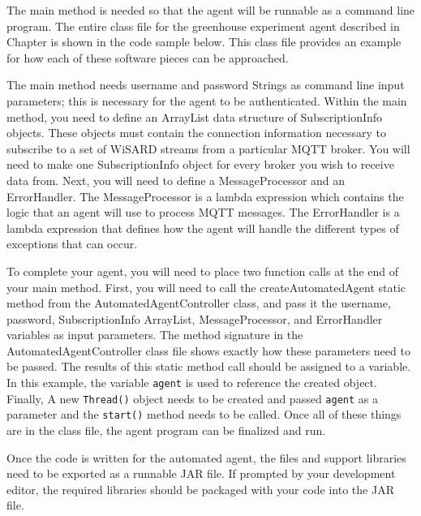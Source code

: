 The main method is needed so that the agent will be runnable as a command line program. The entire class file for the greenhouse experiment agent described in Chapter is shown in the code sample below. This class file provides an example for how each of these software pieces can be approached.



The main method needs username and password Strings as command line input parameters; this is necessary for the agent to be authenticated. Within the main method, you need to define an ArrayList data structure of SubscriptionInfo objects. These objects must contain the connection information necessary to subscribe to a set of WiSARD streams from a particular MQTT broker. You will need to make one SubscriptionInfo object for every broker you wish to receive data from. Next, you will need to define a MessageProcessor and an ErrorHandler. The MessageProcessor is a lambda expression which contains the logic that an agent will use to process MQTT messages. The ErrorHandler is a lambda expression that defines how the agent will handle the different types of exceptions that can occur.

To complete your agent, you will need to place two function calls at the end of your main method. First, you will need to call the createAutomatedAgent static method from the AutomatedAgentController class, and pass it the username, password, SubscriptionInfo ArrayList, MessageProcessor, and ErrorHandler variables as input parameters. The method signature in the AutomatedAgentController class file shows exactly how these parameters need to be passed. The results of this static method call should be assigned to a variable. In this example, the variable \verb|agent| is used to reference the created object. Finally, A new \verb|Thread()| object needs to be created and passed \verb|agent| as a parameter and the \verb|start()| method needs to be called. Once all of these things are in the class file, the agent program can be finalized and run.

Once the code is written for the automated agent, the files and support libraries need to be exported as a runnable JAR file. If prompted by your development editor, the required libraries should be packaged with your code into the JAR file. 